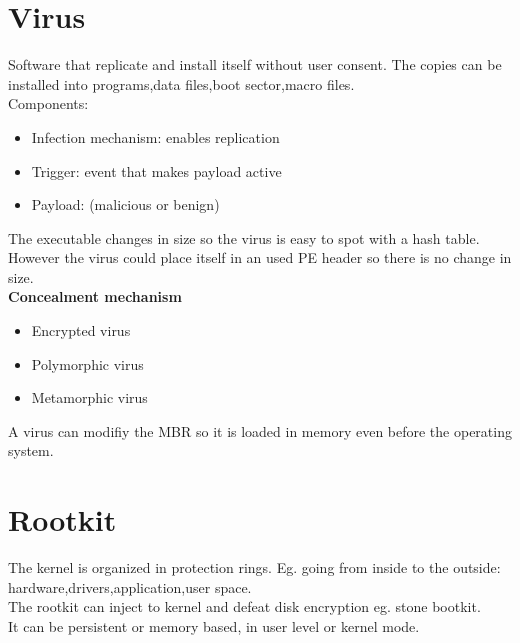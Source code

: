 \documentclass[10pt,a4paper]{book}
\begin{document}
\section{Virus}
Software that replicate and install itself without user consent. The copies can be installed into programs,data files,boot sector,macro files.\\
Components:
\begin{itemize}
\item Infection mechanism: enables replication
\item Trigger: event that makes payload active
\item Payload: (malicious or benign)
\end{itemize}
The executable changes in size so the virus is easy to spot with a hash table.\\
However the virus could place itself in an used PE header so there is no change in size.\\
\textbf{Concealment mechanism}
\begin{itemize}
\item Encrypted virus
\item Polymorphic virus
\item Metamorphic virus
\end{itemize}
A virus can modifiy the MBR so it is loaded in memory even before the operating system.
\section{Rootkit}
The kernel is organized in protection rings. Eg. going from inside to the outside: hardware,drivers,application,user space.\\
The rootkit can inject to kernel and defeat disk encryption eg. stone bootkit.\\
It can be persistent or memory based, in user level or kernel mode.
\end{document}
